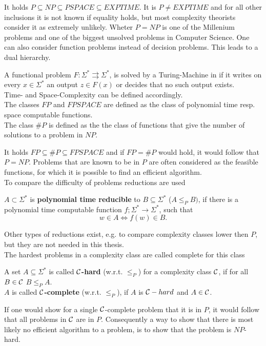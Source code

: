 		It holds $P \subseteq NP \subseteq PSPACE \subseteq EXPTIME$. 
		It is $P \neq EXPTIME$ and for all other inclusions it is not known if equality holds, but most 
		complexity theorists consider it as extremely unlikely.
		Wheter $P = NP$ is one of the Millenium problems and one of the biggest unsolved problems in Computer Science.
		One can also consider function problems instead of decision problems. This leads to a dual hierarchy.
		\begin{definition}
			A functional problem $F: \Sigma^* \rightrightarrows \Sigma^*$, is solved by a Turing-Machine in if it writes on every $x \in \Sigma^*$ an output $z \in F(x)$ or decides that no such output exists.  \\
			Time- and Space-Complexity can be defined accordingly. \\
			The classes $FP$ and $FPSPACE$ are defined as the class of polynomial time resp. space computable functions. \\
			The class $\#P$ is defined as the the class of functions that give the number of solutions to a problem in $NP$. 
		\end{definition}
		It holds $FP \subseteq \#P \subseteq FPSPACE$ and if $FP = \#P$ would hold, it would follow that $P = NP$.
		Problems that are known to be in $P$ are often considered as the feasible functions, 
		for which it is possible to find an efficient algorithm. \\
		To compare the difficulty of problems reductions are used
		\begin{definition}
			$A \subset \Sigma^*$ is \textbf{polynomial time reducible} to $B \subseteq \Sigma^*$ ($A \leq_P B)$, 
			if there is a polynomial time computable function $f; \Sigma^* \to \Sigma^*$, such that
			$$ w \in A \Leftrightarrow f(w) \in B.$$
		\end{definition}
		Other types of reductions exist, e.g. to compare complexity classes lower then $P$, but they are not needed in this thesis. \\
		The hardest problems in a complexity class are called complete for this class
		\begin{definition}
			A set $A \subseteq \Sigma^*$ is called \textbf{$\mathcal C$-hard} (w.r.t. $\leq_P$) for a complexity class $\mathcal C$, if for all $B \in \mathcal C$ $B \leq_P A$. \\
			$A$ is called \textbf{$\mathcal C$-complete} (w.r.t. $\leq_P$), if $A$ is $\mathcal C-hard$ and $A \in \mathcal C$.  
		\end{definition}
		If one would show for a single $\mathcal C$-complete problem that it is in $P$, it would follow that all problems in $\mathcal C$ are in $P$.
		Consequently a way to show that there is most likely no efficient algorithm to a problem, is to show that the problem is $NP$-hard.

